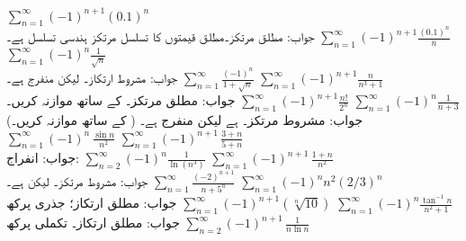 $\sum\limits_{n=1}^{\infty}(-1)^{n+1}(0.1)^n$\\
جواب:\quad
مطلق مرتکز۔مطلق قیمتوں کا تسلسل مرتکز ہندسی تسلسل ہے۔
$\sum\limits_{n=1}^{\infty}(-1)^{n+1}\frac{(0.1)^n}{n}$
$\sum\limits_{n=1}^{\infty}(-1)^n\frac{1}{\sqrt{n}}$\\
جواب:\quad
مشروط ارتکاز۔  لیکن  منفرج ہے۔
$\sum\limits_{n=1}^{\infty}\frac{(-1)^n}{1+\sqrt{n}}$
$\sum\limits_{n=1}^{\infty}(-1)^{n+1}\frac{n}{n^3+1}$\\
جواب:\quad
مطلق مرتکز۔  کے ساتھ موازنہ کریں۔
$\sum\limits_{n=1}^{\infty}(-1)^{n+1}\frac{n!}{2^n}$
$\sum\limits_{n=1}^{\infty}(-1)^n\frac{1}{n+3}$\\
جواب:\quad
مشروط مرتکز۔  ہے لیکن  منفرج ہے۔ ( کے ساتھ موازنہ کریں۔)
$\sum\limits_{n=1}^{\infty}(-1)^n\,\frac{\sin n}{n^2}$
$\sum\limits_{n=1}^{\infty}(-1)^{n+1}\,\frac{3+n}{5+n}$\\
جواب:\quad
انفراج: 
$\sum\limits_{n=2}^{\infty}(-1)^n\frac{1}{\ln (n^3)}$
$\sum\limits_{n=1}^{\infty}(-1)^{n+1}\,\frac{1+n}{n^2}$\\
جواب:\quad
مشروط مرتکز۔  لیکن  ہے۔
$\sum\limits_{n=1}^{\infty}\frac{(-2)^{n+1}}{n+5^n}$
$\sum\limits_{n=1}^{\infty}(-1)^{n} n^2(2/3)^n$\\
جواب:\quad
مطلق ارتکاز؛ جذری پرکھ
$\sum\limits_{n=1}^{\infty}(-1)^{n+1}(\sqrt[n]{10})$
$\sum\limits_{n=1}^{\infty}(-1)^n\frac{\tan^{-1}n}{n^2+1}$\\
جواب:\quad
مطلق ارتکاز۔ تکملی پرکھ
$\sum\limits_{n=2}^{\infty}(-1)^{n+1}\,\frac{1}{n\ln n}$
